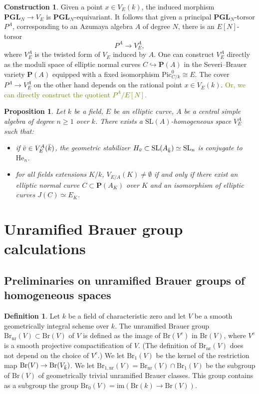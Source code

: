 \documentclass[10pt,letterpaper,twoside]{article}
\newcommand{\BA}[1]{\textcolor{olive}{#1}}
\renewcommand{\1}{\mathbf{1}}
\newcommand{\bP}{\mathbf{P}}
\newcommand{\nr}{\mathrm{nr}}
\newcommand{\im}{\mathrm{im}}
\renewcommand{\geq}{\geqslant}
\newcommand{\PGL}{\mathbf{PGL}}
\newcommand{\Pic}{\mathrm{Pic}}
\newcommand{\Br}{\mathrm{Br}}
\newcommand{\iso}{\cong}
\theoremstyle{plain}
\newtheorem{proposition}[theorem]{Proposition}
\theoremstyle{plain}
\theoremstyle{definition}
\theoremstyle{named}
\theoremstyle{definition}
\newtheorem{definition}[theorem]{Definition}
\newtheorem{construction}[theorem]{Construction}
\begin{document}
\begin{construction}
    Given a point $x\in V_E(k)$, the induced morphism $\PGL_N\rightarrow V_E$ is
    $\PGL_N$-equivariant. It follows that given a principal $\PGL_N$-torsor $P^A$, corresponding to
    an Azumaya algebra $A$ of degree $N$, there is an $E[N]$-torsor $$P^A\rightarrow V_E^A,$$
    where $V_E^A$ is the twisted form of $V_E$ induced by $A$. One can construct $V_E^A$ directly as
    the moduli space of elliptic normal curves $C\hookrightarrow\bP(A)$ in the Severi--Brauer
    variety $\bP(A)$ equipped with a fixed isomorphism $\Pic^0_{C/k}\iso E$.
    The cover $P^A\rightarrow V_E^A$ on the other hand depends on the rational point $x\in V_E(k)$.
    \BA{Or, we can directly construct the quotient $P^A/E[N]$.}
\end{construction}


\begin{proposition}
    Let $k$ be a field, $E$ be an elliptic curve, $A$ be a central simple algebra of degree $n\geq 1$ over $k$. There exists a $\mathrm{SL}(A)$-homogeneous space $V_E^A$ such that:
    \begin{itemize}
    \item if $\Bar{v}\in V_E^A(\Bar{k})$, the geometric stabilizer $H_{\Bar{v}}\subset \mathrm{SL}(A_{\Bar{k}})\simeq \mathrm{SL}_n$ is conjugate to $\mathrm{He}_n$. 
    \item for all fields extensions $K/k$, $V_{E/A}(K)\neq\emptyset$ if and only if there exist an elliptic normal curve $C\subset \bP(A_K)$ over $K$ and an isomorphism of elliptic curves $J(C)\simeq E_K$.
    \end{itemize}
\end{proposition}


	\section{Unramified Brauer group calculations}

\subsection{Preliminaries on unramified Brauer groups of homogeneous spaces}

\begin{definition}
	Let $k$ be a field of characteristic zero and let $V$ be a smooth geometrically integral scheme over $k$. The unramified Brauer group $\Br_{\nr}(V)\subset \Br(V)$ of $V$ is defined as the image of $\Br(V^c)$ in $\Br(V)$, where $V^c$ is a smooth projective compactification of $V$. (The definition of $\Br_{\nr}(V)$ does not depend on the choice of $V^c$.) We
	let $\Br_1(V)$ be the kernel of the restriction map $\Br(V)\to \Br(V_{\Bar{k}})$. We let $\Br_{1,\nr}(V)=\Br_\nr(V)\cap\Br_1(V)$ be the subgroup of $\Br(V)$ of geometrically trivial unramified Brauer classes. This group contains as a
	subgroup the group $\Br_0(V)=\im(\Br(k)\rightarrow\Br(V))$.
\end{definition}
\end{document}
